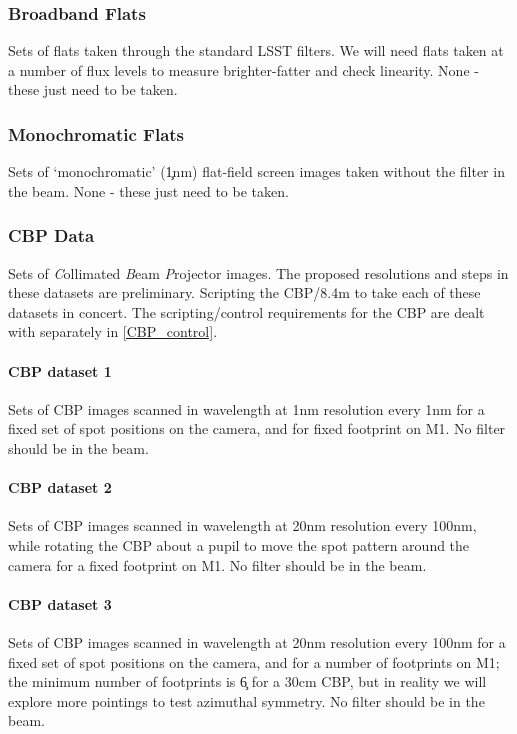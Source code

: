 \subsubsection{Broadband Flats}\label{inputs:broadFlat}
Sets of flats taken through the standard LSST filters.  We will	need flats taken at a number of flux levels to measure brighter-fatter and check linearity.
\alg None - these just need to be taken.


\subsubsection{Monochromatic Flats}\label{inputs:monoFlat}
Sets of `monochromatic' (\c 1nm) flat-field screen images taken without the filter in the beam.
\alg None - these just need to be taken.


\subsubsection{CBP Data}\label{inputs:CBP}
Sets of \textit{C}ollimated \textit{B}eam \textit{P}rojector images. The proposed resolutions and steps in these datasets are preliminary.
\alg Scripting the CBP/8.4m to take each of these datasets in concert. The scripting/control requirements for the CBP are dealt with separately in \ref{CBP_control}.


\paragraph{CBP dataset 1}\label{inputs:CBP:mono}
Sets of CBP images scanned in wavelength at 1nm resolution every 1nm for a fixed set of spot positions on the camera, and for fixed footprint on M1.  No filter should be in the beam.
	
	
\paragraph{CBP dataset 2}\label{inputs:CBP:spot}
Sets of CBP images scanned in wavelength at 20nm resolution every 100nm, while rotating the CBP about a pupil to move the spot pattern around the camera for a fixed footprint on M1.  No filter should be in the beam.

	
\paragraph{CBP dataset 3}\label{inputs:CBP:M1}
Sets of CBP images scanned in wavelength at 20nm resolution every 100nm for a fixed set of spot positions on the camera, and for a number of footprints on M1; the minimum number of footprints is \c 6 for a 30cm CBP, but in reality we will explore more pointings to test azimuthal symmetry. No filter should be in the beam.


